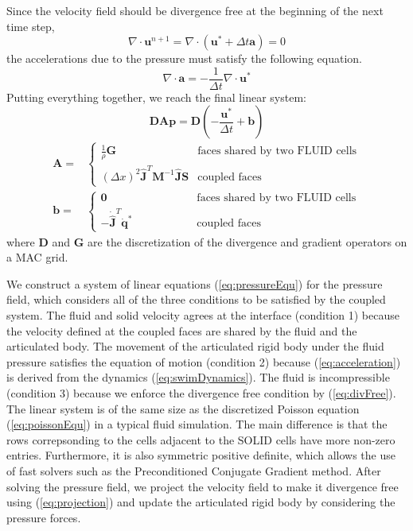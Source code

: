 Since the velocity field should be divergence free at the beginning of the next time step,
\begin{equation}
\label{eq:divFree}
\nabla\cdot\mathbf{u}^{n+1}=\nabla\cdot(\mathbf{u}^*+\Delta t\mathbf{a})=0
\end{equation}
the accelerations due to the pressure must satisfy the following equation.
\begin{displaymath}
\nabla\cdot\mathbf{a}=-\frac{1}{\Delta t}\nabla\cdot\mathbf{u}^*
\end{displaymath}
Putting everything together, we reach the final linear system:
\begin{equation}
\label{eq:pressureEqu}
\mathbf{D}\mathbf{A}\mathbf{p}=\mathbf{D}(-\frac{\mathbf{u}^*}{\Delta t}+\mathbf{b})
\end{equation}
\begin{displaymath}
\begin{array}{ll}
\mathbf{A} = & \left\{ \begin{array}{ll}
\frac{1}{\rho}\mathbf{G} & \textrm{faces shared by two FLUID cells}\\
(\Delta x)^2\hat{\mathbf{J}}^T\mathbf{M}^{-1}\hat{\mathbf{J}}\mathbf{S} & \textrm{coupled faces}
\end{array} \right. \\
\mathbf{b} = & \left\{ \begin{array}{ll}
\mathbf{0} & \textrm{~~~~~~~~~~~~~~~faces shared by two FLUID cells} \\
-\dot{\hat{\mathbf{J}}}^T\mathbf{\dot{q}}^* & \textrm{~~~~~~~~~~~~~~~coupled faces}
\end{array} \right.
\end{array}
\end{displaymath}
where $\mathbf{D}$ and $\mathbf{G}$ are the discretization of the divergence and gradient operators on a MAC grid.

We construct a system of linear equations (\ref{eq:pressureEqu}) for the
pressure field, which considers all of the three conditions to be
satisfied by the coupled system. The fluid and solid velocity agrees at
the interface (condition 1) because the velocity defined at the coupled
faces are shared by the fluid and the articulated body. The movement of
the articulated rigid body under the fluid pressure satisfies the equation
of motion (condition 2) because (\ref{eq:acceleration}) is derived from
the dynamics (\ref{eq:swimDynamics}). The fluid is incompressible
(condition 3) because we enforce the divergence free condition by
(\ref{eq:divFree}). The linear system is of the same size as the
discretized Poisson equation (\ref{eq:poissonEqu}) in a typical fluid
simulation.  The main difference is that the rows correpsonding to the
cells adjacent to the SOLID cells have more non-zero entries. Furthermore,
it is also symmetric positive definite, which allows the use of fast
solvers such as the Preconditioned Conjugate Gradient method. After
solving the pressure field, we project the velocity field to make it divergence free
using (\ref{eq:projection}) and update the articulated rigid body by
considering the pressure forces.

